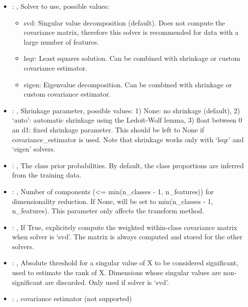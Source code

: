 \begin{itemize}
    \item {}: , 
      Solver to use, possible values:
      \begin{itemize}                                                    \item svd: Singular value
      decomposition (default). Does not compute the covariance matrix,
      therefore this solver is recommended for data with a large number of features.
      \item lsqr: Least squares solution. Can be combined with shrinkage or custom covariance
      estimator.                                                    \item eigen: Eigenvalue
      decomposition. Can be combined with shrinkage or custom covariance estimator.
      \end{itemize}

    \item {}: , 
      Shrinkage parameter, possible values: 1) None: no shrinkage (default),
      2) `auto': automatic shrinkage using the Ledoit-Wolf lemma,
      3) float between 0 an d1: fixed shrinkage parameter.
      This should be left to None if covariance\_estimator is used. Note that shrinkage works
      only with `lsqr' and `eigen' solvers.

    \item {}: , 
      The class prior probabilities. By default, the class proportions are inferred from the
      training data.

    \item {}: , 
      Number of components (<= min(n\_classes - 1, n\_features)) for dimensionality reduction.
      If None, will be set to min(n\_classes - 1, n\_features). This parameter only affects the
      transform                                                  method.

    \item {}: , 
      If True, explicitely compute the weighted within-class covariance matrix when solver
      is `svd'. The matrix is always computed and stored for the other solvers.

    \item {}: , 
      Absolute threshold for a singular value of X to be considered significant, used to estimate
      the rank of X.                                                  Dimensions whose singular
      values are non-significant are discarded. Only used if solver is `svd'.

    \item {}: , 
      covariance estimator (not supported)
  \end{itemize}
